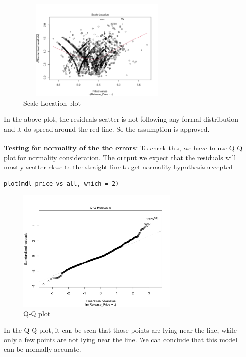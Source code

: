 \documentclass[a4paper]{article}
\theoremstyle{definition}
\begin{document}
\begin{figure}[h!]
\begin{center}
\includegraphics[width=8cm,height=5cm]{images/scale_l.png}
\end{center}
\caption{Scale-Location plot}
\end{figure}
In the above plot, the residuals scatter is not following any formal distribution and it do spread around the red line. So the assumption is approved.\\
\\
\textbf{Testing for normality of the the errors:} To check this, we have to use Q-Q plot for normality consideration. The output we expect that the residuals will mostly scatter close to the straight line to get normality hypothesis accepted.
\begin{mdframed}[leftline=false,rightline=false,backgroundcolor=lightblue!10,nobreak=false]
    \begin{verbatim}
plot(mdl_price_vs_all, which = 2)
\end{verbatim}
\end{mdframed}
\begin{figure}[h!]
\begin{center}
\includegraphics[width=8cm]{images/qq.png}
\end{center}
\caption{Q-Q plot}
\end{figure}
In the Q-Q plot, it can be seen that those points are lying near the line, while only a few points are not lying near the line. We can conclude that this model can be normally accurate.
\end{document}
